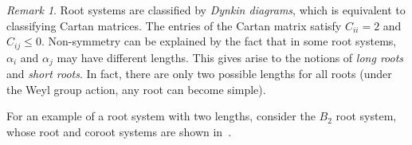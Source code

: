 \documentclass{amsart}
\theoremstyle{definition}
\theoremstyle{remark}
\newtheorem{rmk}[thm]{Remark}
\theoremstyle{plain}
\theoremstyle{definition}
\theoremstyle{remark}
\newcommand{\1}{\mathbf{1}}
\newcommand{\2}{\mathbf{2}}
\newcommand{\3}{\mathbf{3}}
\begin{document}
\begin{rmk}
    Root systems are classified by \textit{Dynkin diagrams}, which is equivalent to classifying Cartan matrices. The entries of the Cartan matrix satisfy \(C_{ii} = 2\) and \(C_{ij} \leq 0\). Non-symmetry can be explained by the fact that in some root systems, \(\alpha_i\) and \(\alpha_j\) may have different lengths. This gives arise to the notions of \textit{long roots} and \textit{short roots}. In fact, there are only two possible lengths for all roots (under the Weyl group action, any root can become simple).
\end{rmk}

For an example of a root system with two lengths, consider the \(B_2\) root system, whose root and coroot systems are shown in~.

\begin{figure}[htpb!]
    \begin{subfigure}{0.4\textwidth}
        \begin{center}
\end{center}
\end{subfigure}
\end{figure}
\end{document}
